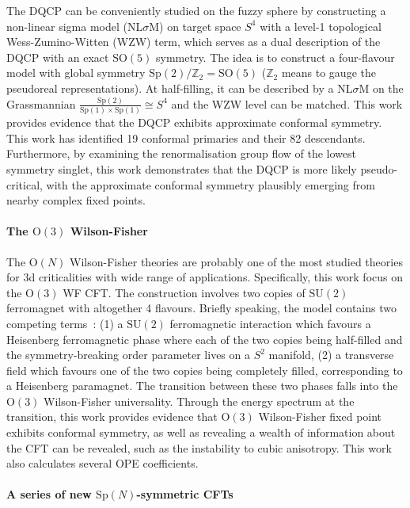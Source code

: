 \documentclass{timesjhep}
\begin{document}
The DQCP can be conveniently studied on the fuzzy sphere by constructing a non-linear sigma model (NL$\sigma$M) on target space $S^4$ with a level-1 topological Wess-Zumino-Witten (WZW) term, which serves as a dual description of the DQCP with an exact $\mathrm{SO}(5)$ symmetry. The idea is to construct a four-flavour model with global symmetry $\mathrm{Sp}(2)/\mathbb{Z}_2=\mathrm{SO}(5)$ ($\mathbb{Z}_2$ means to gauge the pseudoreal representations). At half-filling, it can be described by a NL$\sigma$M on the Grassmannian $\tfrac{\mathrm{Sp}(2)}{\mathrm{Sp}(1)\times\mathrm{Sp}(1)}\cong S^4$ and the WZW level can be matched. This work provides evidence that the DQCP exhibits approximate conformal symmetry. This work has identified 19 conformal primaries and their 82 descendants. Furthermore, by examining the renormalisation group flow of the lowest symmetry singlet, this work demonstrates that the DQCP is more likely pseudo-critical, with the approximate conformal symmetry plausibly emerging from nearby complex fixed points. 

\paragraph{The $\mathrm{O}(3)$ Wilson-Fisher~\cite{Han2023Dec}}

The $\mathrm{O}(N)$ Wilson-Fisher theories are probably one of the most studied theories for 3d criticalities with wide range of applications. Specifically, this work focus on the $\mathrm{O}(3)$ WF CFT. The construction involves two copies of $\mathrm{SU}(2)$ ferromagnet with altogether 4 flavours. Briefly speaking, the model contains two competing terms~: (1) a $\mathrm{SU}(2)$ ferromagnetic interaction which favours a Heisenberg ferromagnetic phase where each of the two copies being half-filled and the symmetry-breaking order parameter lives on a $S^2$ manifold, (2) a transverse field which favours one of the two copies being completely filled, corresponding to a Heisenberg paramagnet. The transition between these two phases falls into the $\mathrm{O}(3)$ Wilson-Fisher universality. Through the energy spectrum at the transition, this work provides evidence that $\mathrm{O}(3)$ Wilson-Fisher fixed point exhibits conformal symmetry, as well as revealing a wealth of information about the CFT can be revealed, such as the instability to cubic anisotropy. This work also calculates several OPE coefficients. 

\paragraph{A series of new $\mathrm{Sp}(N)$-symmetric CFTs~\cite{Zhou2024Oct}}
\end{document}
